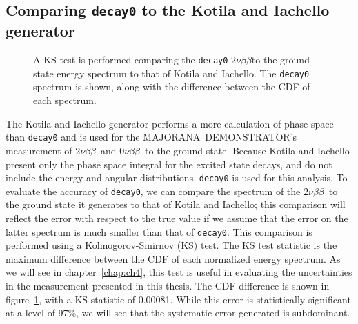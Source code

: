 \documentclass[notitlepage,rmp,aps,10pt]{revtex4-1}
\newcommand{\MJ}{M{\footnotesize AJORANA}}
\newcommand{\Demo}{D{\footnotesize EMON\-STRAT\-OR}}
\newcommand{\MJD}{\MJ\ \Demo}
\newcommand{\znbb}{${0 \nu \beta \beta}$}
\newcommand{\tnbb}{${2 \nu \beta \beta}$}
\begin{document}
\subsection{Comparing \texttt{decay0} to the Kotila and Iachello generator}
\begin{figure}
  \centering
  \caption[KS test comparing \texttt{decay0} to Kotila and Iachello \tnbb to g.s. spectra]{\label{fig:kstest}
    A KS test is performed comparing the \texttt{decay0} \tnbb to the ground state energy spectrum to that of Kotila and Iachello. The \texttt{decay0} spectrum is shown, along with the difference between the CDF of each spectrum.
  }
\end{figure}
The Kotila and Iachello generator performs a more calculation of phase space than \texttt{decay0} and is used for the \MJD 's measurement of \tnbb\ and \znbb\ to the ground state.
Because Kotila and Iachello present only the phase space integral for the excited state decays, and do not include the energy and angular distributions, \texttt{decay0} is used for this analysis.
To evaluate the accuracy of \texttt{decay0}, we can compare the spectrum of the \tnbb\ to the ground state it generates to that of Kotila and Iachello; this comparison will reflect the error with respect to the true value if we assume that the error on the latter spectrum is much smaller than that of \texttt{decay0}.
This comparison is performed using a Kolmogorov-Smirnov (KS) test.
The KS test statistic is the maximum difference between the CDF of each normalized energy spectrum.
As we will see in chapter~\ref{chap:ch4}, this test is useful in evaluating the uncertainties in the measurement presented in this thesis.
The CDF difference is shown in figure~\ref{fig:kstest}, with a KS statistic of 0.00081.
While this error is statistically significant at a level of 97\%, we will see that the systematic error generated is subdominant.
\end{document}
